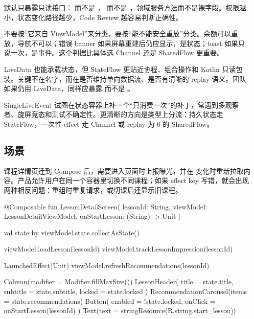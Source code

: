 \begin{idea}[可写性是一种权限]
默认只暴露只读接口： 而不是 ， 而不是 ，领域服务方法而不是裸字段。权限越小，状态变化路径越少，Code Review 越容易判断正确性。
\end{idea}

\begin{pitfall}[状态与事件的判据]
不要按“它来自 ViewModel”来分类，要按“能不能安全重放”分类。余额可以重放，导航不可以；错误 banner 如果屏幕重建后仍应显示，是状态；toast 如果只说一次，是事件。这个判据比具体选 Channel 还是 SharedFlow 更重要。
\end{pitfall}

\begin{followup}
LiveData 也能承载状态，但 StateFlow 更贴近协程、组合操作和 Kotlin 只读包装。关键不在名字，而在是否维持单向数据流、是否有清晰的 replay 语义。团队如果仍用 LiveData，同样应暴露  而不是 。
\end{followup}

\begin{followup}
SingleLiveEvent 试图在状态容器上补一个“只消费一次”的补丁，常遇到多观察者、旋屏竞态和测试不确定性。更清晰的方向是类型上分流：持久状态走 StateFlow，一次性 effect 走 Channel 或 replay 为 0 的 SharedFlow。
\end{followup}


\subsection*{场景}
课程详情页迁到 Compose 后，需要进入页面时上报曝光，并在  变化时重新拉取内容。产品允许用户在同一个容器里切换不同课程；如果 effect key 写错，就会出现两种相反问题：重组时重复请求，或切课后还显示旧课程。

\begin{ktbug}
@Composable
fun LessonDetailScreen(
    lessonId: String,
    viewModel: LessonDetailViewModel,
    onStartLesson: (String) -> Unit
) {
    val state by viewModel.state.collectAsState()

    viewModel.loadLesson(lessonId)
    viewModel.trackLessonImpression(lessonId)

    LaunchedEffect(Unit) {
        viewModel.refreshRecommendations(lessonId)
    }

    Column(modifier = Modifier.fillMaxSize()) {
        LessonHeader(
            title = state.title,
            subtitle = state.subtitle,
            locked = state.locked
        )
        RecommendationCarousel(items = state.recommendations)
        Button(
            enabled = !state.locked,
            onClick = { onStartLesson(lessonId) }
        ) {
            Text(text = stringResource(R.string.start_lesson))
        }
    }
}
\end{ktbug}

